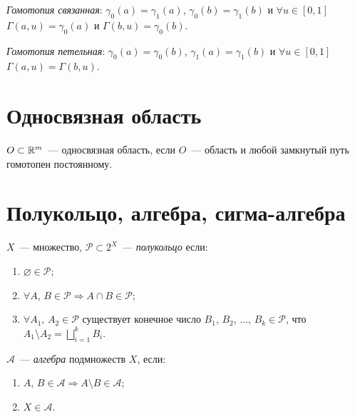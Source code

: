 \documentclass{article}
\begin{document}
        \textit{Гомотопия связанная}: $\gamma_0(a) = \gamma_1(a)$, $\gamma_0(b) = \gamma_1(b)$ и $\forall u \in [0, 1]$ $\Gamma(a, u) = \gamma_0(a)$ и $\Gamma(b, u) = \gamma_0(b)$.
        
        \textit{Гомотопия петельная}: $\gamma_0(a) = \gamma_0(b)$, $\gamma_1(a) = \gamma_1(b)$ и $\forall u \in [0, 1]$ $\Gamma(a, u) = \Gamma(b, u)$.
        
    \newpage
    
    \section{Односвязная область}
    
        $O \subset \mathbb{R}^m$~--- односвязная область, если $O$~--- область и любой замкнутый путь гомотопен постоянному.
        
    \newpage
    
    \section{Полукольцо, алгебра, сигма-алгебра}
    
        $X$~--- множество, $\mathcal{P} \subset 2^X$~--- \textit{полукольцо} если:
        
        \begin{enumerate}
        
            \item $\varnothing \in \mathcal{P}$;
            
            \item $\forall A$, $B \in \mathcal{P} \Rightarrow A \cap B \in \mathcal{P}$;
            
            \item $\forall A_1$, $A_2 \in \mathcal{P}$ существует конечное число $B_1$, $B_2$, $\ldots$, $B_k \in \mathcal{P}$, что $A_1 \setminus A_2 =  \bigsqcup\limits^k_{i = 1} B_i$.
            
        \end{enumerate}
    
        $\mathcal{A}$~--- \textit{алгебра} подмножеств $X$, если:
        
        \begin{enumerate}
        
            \item $A$, $B \in \mathcal{A} \Rightarrow A \setminus B \in \mathcal{A}$;
            
            \item $X \in \mathcal{A}$.
            
        \end{enumerate}
        
\end{document}
